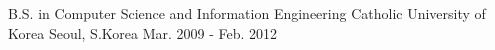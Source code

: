 \begin{cventries}
  \cventry
    {B.S. in Computer Science and Information Engineering}
    {Catholic University of Korea}
    {Seoul, S.Korea}
    {Mar. 2009 - Feb. 2012}
    {
      \begin{cvitems}
      \end{cvitems}
    }
\end{cventries}
